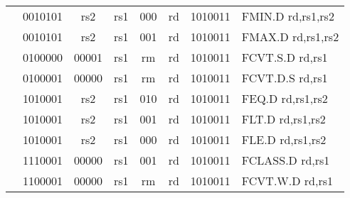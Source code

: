\begin{table}[p]
\begin{small}
\begin{center}
\begin{tabular}{p{0in}p{0.4in}p{0.05in}p{0.05in}p{0.05in}p{0.05in}p{0.4in}p{0.6in}p{0.4in}p{0.6in}p{0.7in}l}
&
\multicolumn{4}{|c|}{0010101} &
\multicolumn{2}{c|}{rs2} &
\multicolumn{1}{c|}{rs1} &
\multicolumn{1}{c|}{000} &
\multicolumn{1}{c|}{rd} &
\multicolumn{1}{c|}{1010011} & FMIN.D rd,rs1,rs2 \\
\cline{2-11}
  

&
\multicolumn{4}{|c|}{0010101} &
\multicolumn{2}{c|}{rs2} &
\multicolumn{1}{c|}{rs1} &
\multicolumn{1}{c|}{001} &
\multicolumn{1}{c|}{rd} &
\multicolumn{1}{c|}{1010011} & FMAX.D rd,rs1,rs2 \\
\cline{2-11}
  

&
\multicolumn{4}{|c|}{0100000} &
\multicolumn{2}{c|}{00001} &
\multicolumn{1}{c|}{rs1} &
\multicolumn{1}{c|}{rm} &
\multicolumn{1}{c|}{rd} &
\multicolumn{1}{c|}{1010011} & FCVT.S.D rd,rs1 \\
\cline{2-11}
  

&
\multicolumn{4}{|c|}{0100001} &
\multicolumn{2}{c|}{00000} &
\multicolumn{1}{c|}{rs1} &
\multicolumn{1}{c|}{rm} &
\multicolumn{1}{c|}{rd} &
\multicolumn{1}{c|}{1010011} & FCVT.D.S rd,rs1 \\
\cline{2-11}
  

&
\multicolumn{4}{|c|}{1010001} &
\multicolumn{2}{c|}{rs2} &
\multicolumn{1}{c|}{rs1} &
\multicolumn{1}{c|}{010} &
\multicolumn{1}{c|}{rd} &
\multicolumn{1}{c|}{1010011} & FEQ.D rd,rs1,rs2 \\
\cline{2-11}
  

&
\multicolumn{4}{|c|}{1010001} &
\multicolumn{2}{c|}{rs2} &
\multicolumn{1}{c|}{rs1} &
\multicolumn{1}{c|}{001} &
\multicolumn{1}{c|}{rd} &
\multicolumn{1}{c|}{1010011} & FLT.D rd,rs1,rs2 \\
\cline{2-11}
  

&
\multicolumn{4}{|c|}{1010001} &
\multicolumn{2}{c|}{rs2} &
\multicolumn{1}{c|}{rs1} &
\multicolumn{1}{c|}{000} &
\multicolumn{1}{c|}{rd} &
\multicolumn{1}{c|}{1010011} & FLE.D rd,rs1,rs2 \\
\cline{2-11}
  

&
\multicolumn{4}{|c|}{1110001} &
\multicolumn{2}{c|}{00000} &
\multicolumn{1}{c|}{rs1} &
\multicolumn{1}{c|}{001} &
\multicolumn{1}{c|}{rd} &
\multicolumn{1}{c|}{1010011} & FCLASS.D rd,rs1 \\
\cline{2-11}
  

&
\multicolumn{4}{|c|}{1100001} &
\multicolumn{2}{c|}{00000} &
\multicolumn{1}{c|}{rs1} &
\multicolumn{1}{c|}{rm} &
\multicolumn{1}{c|}{rd} &
\multicolumn{1}{c|}{1010011} & FCVT.W.D rd,rs1 \\
\cline{2-11}
  


\end{tabular}
\end{center}
\end{small}
\end{table}
